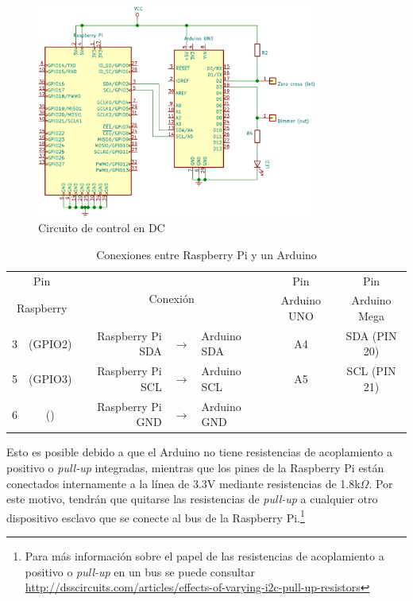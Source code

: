 \begin{figure}[H]
	\centering
	\includegraphics[width=0.5\columnwidth,height=7cm,keepaspectratio]{img/circuit-dc.png}
	\caption{Circuito de control en DC}%
	\label{fig:circuit-dc}
\end{figure}


\begin{table}
	\centering
	\caption{Conexiones \IIC entre Raspberry Pi y un Arduino}
	\label{tbl:pi-arduino-i2c} %
	\begin{tabularx}{0.8\linewidth}{cc rcl c c}
	\toprule
	\multicolumn{2}{c}{   Pin   } & \multicolumn{3}{c}{\multirow{2}{*}{Conexión}}  &     Pin     &     Pin     \\
	\multicolumn{2}{c}{Raspberry} & \multicolumn{3}{c}{}                           & Arduino UNO & Arduino Mega \\
	\midrule
	       3 & (GPIO2)            & Raspberry Pi SDA & \(\rightarrow{}\) & Arduino SDA & A4          & SDA (PIN 20) \\
	       5 & (GPIO3)            & Raspberry Pi SCL & \(\rightarrow{}\) & Arduino SCL & A5          & SCL (PIN 21) \\
	       6 & (\GND)             & Raspberry Pi GND & \(\rightarrow{}\) & Arduino GND & \GND        & \GND         \\
	\bottomrule
	\end{tabularx}
\end{table}

Esto es posible debido a que el Arduino no tiene resistencias de acoplamiento a positivo o \emph{pull-up} integradas, mientras que los pines \IIC de la Raspberry Pi están conectados internamente a la línea de 3.3V mediante resistencias de 1.8k\(\Omega{}\).
Por este motivo, tendrán que quitarse las resistencias de \emph{pull-up} a cualquier otro dispositivo esclavo que se conecte al bus \IIC de la Raspberry Pi.\footnote{Para más información sobre el papel de las resistencias de acoplamiento a positivo o \emph{pull-up} en un bus \IIC se puede consultar \url{http://dsscircuits.com/articles/effects-of-varying-i2c-pull-up-resistors} }

